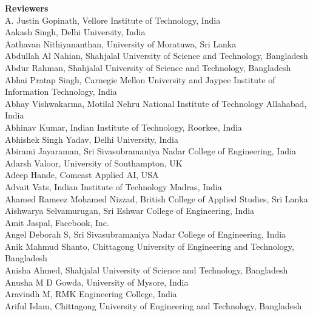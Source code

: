 \documentclass[11pt,oneside]{book}
\begin{document}
\begin{description}
  \item{\bf Reviewers}\vspace{2mm}\\
            A. Justin Gopinath, Vellore Institute of Technology, India\\
          Aakash Singh, Delhi University, India\\
          Aathavan Nithiyananthan, University of Moratuwa, Sri Lanka\\
          Abdullah Al Nahian, Shahjalal University of Science and Technology, Bangladesh\\
          Abdur Rahman, Shahjalal University of Science and Technology, Bangladesh\\
          Abhai Pratap Singh, Carnegie Mellon University and Jaypee Institute of Information Technology, India\\
          Abhay Vishwakarma, Motilal Nehru National Institute of Technology Allahabad, India\\
          Abhinav Kumar, Indian Institute of Technology, Roorkee, India\\
          Abhishek Singh Yadav, Delhi University, India\\
          Abirami Jayaraman, Sri Sivasubramaniya Nadar College of Engineering, India\\
          Adarsh Valoor, University of Southampton, UK\\
          Adeep Hande, Comcast Applied AI, USA\\
          Advait Vats, Indian Institute of Technology Madras, India\\
          Ahamed Rameez Mohamed Nizzad, British College of Applied Studies, Sri Lanka\\
          Aishwarya Selvamurugan, Sri Eshwar College of Engineering, India\\
          Amit Jaspal, Facebook, Inc.\\
          Angel Deborah S, Sri Sivasubramaniya Nadar College of Engineering, India\\
          Anik Mahmud Shanto, Chittagong University of Engineering and Technology, Bangladesh\\
          Anisha Ahmed, Shahjalal University of Science and Technology, Bangladesh\\
          Anusha M D Gowda, University of Mysore, India\\
          Aravindh M, RMK Engineering College, India\\
          Ariful Islam, Chittagong University of Engineering and Technology, Bangladesh\\

\end{description}
\end{document}
